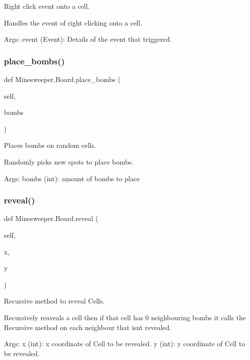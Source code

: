 \begin{DoxyVerb}Right click event onto a cell.

Handles the event of right clicking onto a cell.

Args:
    event (Event): Details of the event that triggered.
\end{DoxyVerb}
 \mbox{\label{class_minesweeper_1_1_board_a98ef006d12ffc5b634a387277b2d4c10}} 
\subsubsection{\texorpdfstring{place\+\_\+bombs()}{place\_bombs()}}
{\footnotesize\ttfamily def Minesweeper.\+Board.\+place\+\_\+bombs (\begin{DoxyParamCaption}\item[{}]{self,  }\item[{}]{bombs }\end{DoxyParamCaption})}

\begin{DoxyVerb}Places bombs on random cells.

Randomly picks new spots to place bombs.

Args:
    bombs (int): amount of bombs to place
\end{DoxyVerb}
 \mbox{\label{class_minesweeper_1_1_board_aeb82e108501b60f530240d95e7de3ef8}} 
\subsubsection{\texorpdfstring{reveal()}{reveal()}}
{\footnotesize\ttfamily def Minesweeper.\+Board.\+reveal (\begin{DoxyParamCaption}\item[{}]{self,  }\item[{}]{x,  }\item[{}]{y }\end{DoxyParamCaption})}

\begin{DoxyVerb}Recursive method to reveal Cells.

Recursively reaveals a cell then if that cell has 0 neighbouring bombs
it calls the Recursive method on each neighbour that isnt revealed.

Args:
    x (int): x coordinate of Cell to be revealed.
    y (int): y coordinate of Cell to be revealed.\end{DoxyVerb}
 \mbox{\label{class_minesweeper_1_1_board_a90957ea377719961be1ab1e7a407e009}} 

